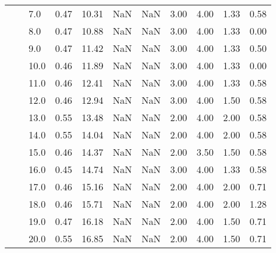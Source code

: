 \begin{tabular}{lllrrrrrrrr}
       &     & 7.0  &      0.47 &      10.31 &               NaN &                NaN & 3.00 &   4.00 &             1.33 &                         0.58 \\
       &     & 8.0  &      0.47 &      10.88 &               NaN &                NaN & 3.00 &   4.00 &             1.33 &                         0.00 \\
       &     & 9.0  &      0.47 &      11.42 &               NaN &                NaN & 3.00 &   4.00 &             1.33 &                         0.50 \\
       &     & 10.0 &      0.46 &      11.89 &               NaN &                NaN & 3.00 &   4.00 &             1.33 &                         0.00 \\
       &     & 11.0 &      0.46 &      12.41 &               NaN &                NaN & 3.00 &   4.00 &             1.33 &                         0.58 \\
       &     & 12.0 &      0.46 &      12.94 &               NaN &                NaN & 3.00 &   4.00 &             1.50 &                         0.58 \\
       &     & 13.0 &      0.55 &      13.48 &               NaN &                NaN & 2.00 &   4.00 &             2.00 &                         0.58 \\
       &     & 14.0 &      0.55 &      14.04 &               NaN &                NaN & 2.00 &   4.00 &             2.00 &                         0.58 \\
       &     & 15.0 &      0.46 &      14.37 &               NaN &                NaN & 2.00 &   3.50 &             1.50 &                         0.58 \\
       &     & 16.0 &      0.45 &      14.74 &               NaN &                NaN & 3.00 &   4.00 &             1.33 &                         0.58 \\
       &     & 17.0 &      0.46 &      15.16 &               NaN &                NaN & 2.00 &   4.00 &             2.00 &                         0.71 \\
       &     & 18.0 &      0.46 &      15.71 &               NaN &                NaN & 2.00 &   4.00 &             2.00 &                         1.28 \\
       &     & 19.0 &      0.47 &      16.18 &               NaN &                NaN & 2.00 &   4.00 &             1.50 &                         0.71 \\
       &     & 20.0 &      0.55 &      16.85 &               NaN &                NaN & 2.00 &   4.00 &             1.50 &                         0.71 \\

\end{tabular}
